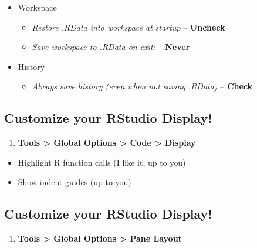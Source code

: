 \documentclass[
  letterpaper,
  DIV=11,
  numbers=noendperiod,
  oneside]{scrartcl}
\providecommand{\tightlist}{%
  \setlength{\itemsep}{0pt}\setlength{\parskip}{0pt}}\usepackage{longtable,booktabs,array}
\begin{document}
\begin{itemize}
\tightlist
\item
  Workspace

  \begin{itemize}
  \tightlist
  \item
    \emph{Restore .RData into workspace at startup} -- \textbf{Uncheck}
  \item
    \emph{Save workspace to .RData on exit:} -- \textbf{Never}
  \end{itemize}
\item
  History

  \begin{itemize}
  \tightlist
  \item
    \emph{Always save history (even when not saving .RData)} --
    \textbf{Check}
  \end{itemize}
\end{itemize}

\hypertarget{customize-your-rstudio-display-1}{%
\subsection{Customize your RStudio
Display!}\label{customize-your-rstudio-display-1}}

\begin{enumerate}
\def\labelenumi{\arabic{enumi}.}
\setcounter{enumi}{1}
\tightlist
\item
  \textbf{Tools \textgreater{} Global Options \textgreater{} Code
  \textgreater{} Display}
\end{enumerate}

\begin{itemize}
\tightlist
\item
  Highlight R function calls (I like it, up to you)
\item
  Show indent guides (up to you)
\end{itemize}

\hypertarget{customize-your-rstudio-display-2}{%
\subsection{Customize your RStudio
Display!}\label{customize-your-rstudio-display-2}}

\begin{enumerate}
\def\labelenumi{\arabic{enumi}.}
\setcounter{enumi}{2}
\tightlist
\item
  \textbf{Tools \textgreater{} Global Options \textgreater{} Pane
  Layout}
\end{enumerate}
\end{document}

